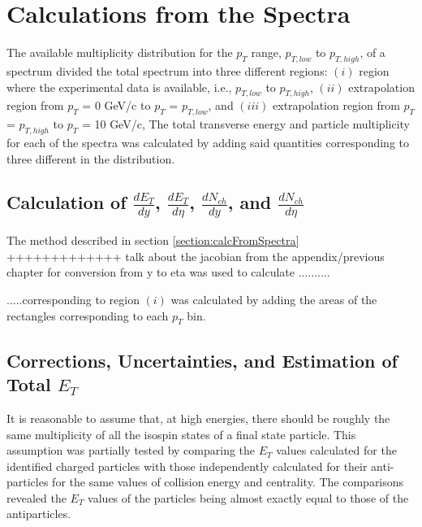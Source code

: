 \section{Calculations from the Spectra}
The available multiplicity distribution for the $p_{T}$ range, $p_{T,low}$ to $p_{T,high}$, of a spectrum divided the total spectrum into three different regions: $(i)$ region where the experimental data is available, i.e., $p_{T,low}$ to $p_{T,high}$, $(ii)$ extrapolation region from $p_{T}$ = 0 GeV/c to $p_{T}$ = $p_{T,low}$, and $(iii)$ extrapolation region from $p_{T}$ = $p_{T,high}$ to $p_{T}$ = 10 GeV/c,  
The total transverse energy and particle multiplicity for each of the spectra was calculated by adding said quantities corresponding to three different in the distribution.
\subsection{Calculation of $\frac{dE_{T}}{dy}$, $\frac{dE_{T}}{d\eta}$, $\frac{dN_{ch}}{dy}$, and $\frac{dN_{ch}}{d\eta}$}
The method described in section \ref{section:calcFromSpectra} +++++++++++++ talk about the jacobian from the appendix/previous chapter for conversion from y to eta was used to calculate ..........

.....corresponding to region $(i)$ was calculated by adding the areas of the rectangles corresponding to each $p_{T}$ bin.

\subsection{Corrections, Uncertainties, and Estimation of Total $E_{T}$}\label{corrections}
It is reasonable to assume that, at high energies, there should be roughly the same multiplicity of all the isospin states of a final state particle. This assumption was partially tested by comparing the $E_{T}$ values calculated for the identified charged particles with those independently calculated for their anti-particles for the same values of collision energy and centrality. The comparisons revealed the $E_{T}$ values of the particles being almost exactly equal to those of the antiparticles.

